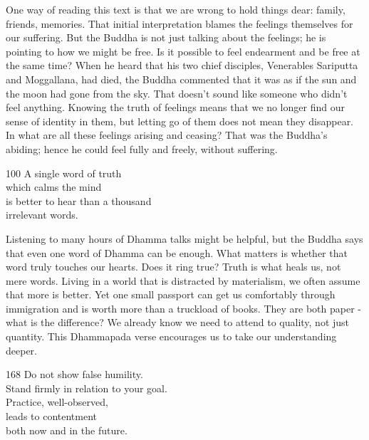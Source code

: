 \begin{dhpRefl}
  One way of reading this text is that we are wrong to hold things dear: family,
  friends, memories. That initial interpretation blames the feelings themselves
  for our suffering. But the Buddha is not just talking about the feelings; he
  is pointing to how we might be free. Is it possible to feel endearment and be
  free at the same time? When he heard that his two chief disciples, Venerables
  Sariputta and Moggallana, had died, the Buddha commented that it was as if the
  sun and the moon had gone from the sky. That doesn’t sound like someone who
  didn't feel anything. Knowing the truth of feelings means that we no longer
  find our sense of identity in them, but letting go of them does not mean they
  disappear. In what are all these feelings arising and ceasing? That was the
  Buddha’s abiding; hence he could feel fully and freely, without suffering.
\end{dhpRefl}


\begin{dhpVerse}{100}
\label{dhp-100}
A single word of truth\\
which calms the mind\\
is better to hear than a thousand\\
irrelevant words.
\end{dhpVerse}

\begin{dhpRefl}
  Listening to many hours of Dhamma talks might be helpful, but the Buddha says
  that even one word of Dhamma can be enough. What matters is whether that word
  truly touches our hearts. Does it ring true? Truth is what heals us, not mere
  words. Living in a world that is distracted by materialism, we often assume
  that more is better. Yet one small passport can get us comfortably through
  immigration and is worth more than a truckload of books. They are both paper -
  what is the difference? We already know we need to attend to quality, not just
  quantity. This Dhammapada verse encourages us to take our understanding
  deeper.
\end{dhpRefl}


\begin{dhpVerse}{168}
\label{dhp-168}
Do not show false humility.\\
Stand firmly in relation to your goal.\\
Practice, well-observed,\\
leads to contentment\\
both now and in the future.
\end{dhpVerse}

